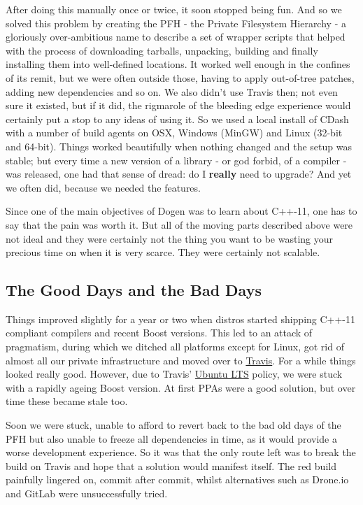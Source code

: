 \documentclass{book}
\begin{document}
After doing this manually once or twice, it soon stopped being
fun. And so we solved this problem by creating the PFH - the Private
Filesystem Hierarchy - a gloriously over-ambitious name to describe a
set of wrapper scripts that helped with the process of downloading
tarballs, unpacking, building and finally installing them into
well-defined locations. It worked well enough in the confines of its
remit, but we were often outside those, having to apply out-of-tree
patches, adding new dependencies and so on. We also didn't use Travis
then; not even sure it existed, but if it did, the rigmarole of the
bleeding edge experience would certainly put a stop to any ideas of
using it. So we used a local install of CDash with a number of build
agents on OSX, Windows (MinGW) and Linux (32-bit and 64-bit). Things
worked beautifully when nothing changed and the setup was stable; but
every time a new version of a library - or god forbid, of a compiler -
was released, one had that sense of dread: do I \textbf{really} need to
upgrade? And yet we often did, because we needed the features.

Since one of the main objectives of Dogen was to learn about C++-11,
one has to say that the pain was worth it. But all of the moving parts
described above were not ideal and they were certainly not the thing
you want to be wasting your precious time on when it is very
scarce. They were certainly not scalable.

\subsection*{The Good Days and the Bad Days}
\label{sec-2-2}

Things improved slightly for a year or two when distros started
shipping C++-11 compliant compilers and recent Boost versions. This
led to an attack of pragmatism, during which we ditched all platforms
except for Linux, got rid of almost all our private infrastructure and
moved over to \href{https://travis-ci.org/DomainDrivenConsulting/dogen}{Travis}. For a while things looked really good. However,
due to Travis' \href{https://wiki.ubuntu.com/LTS}{Ubuntu LTS} policy, we were stuck with a rapidly ageing
Boost version. At first PPAs were a good solution, but over time these
became stale too.

Soon we were stuck, unable to afford to revert back to the bad old
days of the PFH but also unable to freeze all dependencies in time, as
it would provide a worse development experience. So it was that the
only route left was to break the build on Travis and hope that a
solution would manifest itself. The red build painfully lingered on,
commit after commit, whilst alternatives such as Drone.io and GitLab
were unsuccessfully tried.
\end{document}
